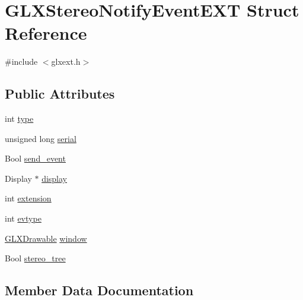 \hypertarget{struct_g_l_x_stereo_notify_event_e_x_t}{}\section{G\+L\+X\+Stereo\+Notify\+Event\+E\+XT Struct Reference}
\label{struct_g_l_x_stereo_notify_event_e_x_t}


{\ttfamily \#include $<$glxext.\+h$>$}

\subsection*{Public Attributes}
\begin{DoxyCompactItemize}
\item 
int \hyperlink{struct_g_l_x_stereo_notify_event_e_x_t_a098037ce0974bffdeb483d2a11d61643}{type}
\item 
unsigned long \hyperlink{struct_g_l_x_stereo_notify_event_e_x_t_ae1e4129c552f83aedc025285289aa1c9}{serial}
\item 
Bool \hyperlink{struct_g_l_x_stereo_notify_event_e_x_t_a8cfd4a4d82499cf3784eb3880b65af3a}{send\+\_\+event}
\item 
Display $\ast$ \hyperlink{struct_g_l_x_stereo_notify_event_e_x_t_a66b9c9af34977ca155c83f3cf31eec10}{display}
\item 
int \hyperlink{struct_g_l_x_stereo_notify_event_e_x_t_a3a648bb8af498f7c8dfcd1c5790f798e}{extension}
\item 
int \hyperlink{struct_g_l_x_stereo_notify_event_e_x_t_ab1ba0612de321691a9e617673b0adb38}{evtype}
\item 
\hyperlink{glx_8h_a826f51745d9d6c81bdbac47ae2b80cf7}{G\+L\+X\+Drawable} \hyperlink{struct_g_l_x_stereo_notify_event_e_x_t_ac59f259d82ae632609172f48d7b10d01}{window}
\item 
Bool \hyperlink{struct_g_l_x_stereo_notify_event_e_x_t_ac9ba848b101465fd03dee4879aaa5c93}{stereo\+\_\+tree}
\end{DoxyCompactItemize}


\subsection{Member Data Documentation}
\mbox{\label{struct_g_l_x_stereo_notify_event_e_x_t_a66b9c9af34977ca155c83f3cf31eec10}} 
